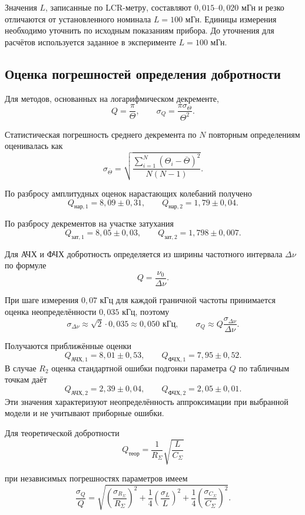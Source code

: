 \documentclass[a4paper,14pt]{extarticle}
\begin{document}
Значения $L$, записанные по LCR-метру, составляют
$0{,}015$--$0{,}020$ мГн и резко отличаются от установленного
номинала $L=100$ мГн. Единицы измерения необходимо уточнить
по исходным показаниям прибора. До уточнения для расчётов
используется заданное в эксперименте $L=100$ мГн.

\subsection{Оценка погрешностей определения добротности}
Для методов, основанных на логарифмическом декременте,
\[
    Q=\frac{\pi}{\Theta},\qquad
    \sigma_Q=\frac{\pi\sigma_\Theta}{\Theta^2}.
\]

Статистическая погрешность среднего декремента по $N$
повторным определениям оценивалась как
\[
    \sigma_{\overline\Theta}=
    \sqrt{\frac{\sum_{i=1}^{N}(\Theta_i-\overline\Theta)^2}
    {N(N-1)}}.
\]

По разбросу амплитудных оценок нарастающих колебаний получено
\[
    Q_{\text{нар},1}=8{,}09\pm0{,}31,\qquad
    Q_{\text{нар},2}=1{,}79\pm0{,}04.
\]

По разбросу декрементов на участке затухания
\[
    Q_{\text{зат},1}=8{,}05\pm0{,}03,\qquad
    Q_{\text{зат},2}=1{,}798\pm0{,}007.
\]

Для АЧХ и ФЧХ добротность определяется из ширины
частотного интервала $\Delta\nu$ по формуле
\[
    Q=\frac{\nu_0}{\Delta\nu}.
\]

При шаге измерения $0{,}07$ кГц для каждой граничной
частоты принимается оценка неопределённости $0{,}035$ кГц,
поэтому
\[
    \sigma_{\Delta\nu}\approx\sqrt2\cdot0{,}035
    \approx0{,}050\text{ кГц},\qquad
    \sigma_Q\approx Q\frac{\sigma_{\Delta\nu}}{\Delta\nu}.
\]

Получаются приближённые оценки
\[
    Q_{\text{АЧХ},1}=8{,}01\pm0{,}53,\qquad
    Q_{\text{ФЧХ},1}=7{,}95\pm0{,}52.
\]
В случае $R_2$ оценка стандартной ошибки подгонки
параметра $Q$ по табличным точкам даёт
\[
    Q_{\text{АЧХ},2}=2{,}39\pm0{,}04,\qquad
    Q_{\text{ФЧХ},2}=2{,}05\pm0{,}01.
\]
Эти значения характеризуют неопределённость аппроксимации
при выбранной модели и не учитывают приборные ошибки.

Для теоретической добротности
\[
    Q_{\text{теор}}=\frac{1}{R_\Sigma}
        \sqrt{\frac{L}{C_\Sigma}}
\]

при независимых погрешностях параметров имеем
\[
    \frac{\sigma_Q}{Q}=
    \sqrt{\left(\frac{\sigma_{R_\Sigma}}{R_\Sigma}\right)^2+
    \frac14\left(\frac{\sigma_L}{L}\right)^2+
    \frac14\left(\frac{\sigma_{C_\Sigma}}{C_\Sigma}\right)^2}.
\]
\end{document}
